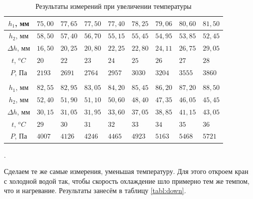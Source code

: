 \documentclass[a4paper, 12pt]{article}
\newcounter{Points}
\newcommand{\point}{\arabic{Points}. \addtocounter{Points}{1}}
\begin{document}
\begin{table}[!h]
    \begin{tabularx}{\linewidth}{|c|X|X|X|X|X|X|X|X|}
        \hline
        $h_1$, мм & $75,00$ & $77,65$ & $77,50$ & $77,40$ & $78,25$ & $79,06$ & $80,60$ & $81,50$ \\ \hline

        $h_2$, мм & $58,50$ & $57,40$ & $56,70$ & $55,15$ & $55,45$ & $54,95$ & $53,85$ & $52,45$ \\ \hline

        $\Delta h$, мм & $16,50$ & $20,25$ & $20,80$ & $22,25$ & $22,80$ & $24,11$ & $26,75$ & $29,05$ \\ \hline

        $t$, $^o C$ & $20$ & $22$ & $23$ & $24$ & $25$ & $26$ & $27$ & $28$ \\ \hline
        
        $P$, Па & $2193$ & $2691$ & $2764$ & $2957$ & $3030$ & $3204$ & $3555$ & $3860$
        \\ \hline \multicolumn{9}{c}{} \\ \hline

        $h_1$, мм & $82,55$ & $82,95$ & $83,05$ & $84,20$ & $85,45$ & $86,20$ & $87,20$ & $88,50$ \\ \hline

        $h_2$, мм & $52,40$ & $51,90$ & $51,10$ & $50,60$ & $48,40$ & $47,35$ & $46,05$ & $45,45$ \\ \hline

        $\Delta h$, мм & $30,15$ & $31,05$ & $31,95$ & $33,60$ & $37,05$ & $38,85$ & $41,15$ & $43,05$ \\ \hline

        $t$, $^o C$ & $29$ & $30$ & $31$ & $32$ & $33$ & $34$ & $35$ & $36$ \\ \hline

        $P$, Па & $4007$ & $4126$ & $4246$ & $4465$ & $4923$ & $5163$ & $5468$ & $5721$ \\ \hline
    \end{tabularx}
\caption{Результаты измерений при увеличении температуры}
\label{tabl:up}
\end{table}

\point Сделаем те же самые измерения, уменьшая температуру. Для этого откроем кран с холодной водой так, чтобы скорость охлаждение шло примерно тем же темпом, что и нагревание. Результаты занесём в таблицу \ref{tabl:down}.
\end{document}
